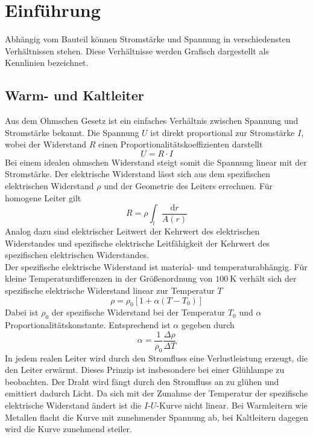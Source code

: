 \section{Einführung}
Abhängig vom Bauteil können Stromstärke und Spannung in verschiedensten Verhältnissen stehen. Diese Verhältnisse werden Grafisch dargestellt als Kennlinien bezeichnet. 
\subsection{Warm- und Kaltleiter}
Aus dem Ohmschen Gesetz ist ein einfaches Verhältnis zwischen Spannung und Stromstärke bekannt. Die Spannung $ U $ ist direkt proportional zur Stromstärke $ I $, wobei der Widerstand $ R $ einen Proportionalitätskoeffizienten darstellt 
\begin{equation}
	U = R\cdot I
\end{equation}
Bei einem idealen ohmschen Widerstand steigt somit die Spannung linear mit der Stromstärke. Der elektrische Widerstand lässt sich aus dem spezifischen elektrischen Widerstand $ \rho $ und der Geometrie des Leiters errechnen. Für homogene Leiter gilt
\begin{equation}
	R = \rho\int\nolimits_l\frac{\mathrm dr}{A(r)} 
\end{equation}
Analog dazu sind elektrischer Leitwert der Kehrwert des elektrischen Widerstandes und spezifische elektrische Leitfähigkeit der Kehrwert des spezifischen elektrischen Widerstandes.  \\
Der spezifische elektrische Widerstand ist material- und temperaturabhängig. Für kleine Temperaturdifferenzen in der Größenordnung von $ \SI{100}{\kelvin} $ verhält sich der spezifische elektrische Widerstand linear zur Temperatur $ T $
\begin{equation}
	\rho = \rho_0 [1 + \alpha(T - T_0)]
\end{equation}
Dabei ist $ \rho_0 $ der spezifische Widerstand bei der Temperatur $ T_0 $ und $ \alpha $ Proportionalitätskonstante. Entsprechend ist $ \alpha $ gegeben durch
\begin{equation}
	\alpha = \frac{1}{\rho_0} \frac{\Delta \rho}{\Delta T}
\end{equation}
In jedem realen Leiter wird durch den Stromfluss eine Verlustleistung erzeugt, die den Leiter erwärmt. Dieses Prinzip ist insbesondere bei einer Glühlampe zu beobachten. Der Draht wird fängt durch den Stromfluss an zu glühen und emittiert dadurch Licht. Da sich mit der Zunahme der Temperatur der spezifische elektrische Widerstand ändert ist die $ I $-$ U $-Kurve nicht linear. Bei Warmleitern wie Metallen flacht die Kurve mit zunehmender Spannung ab, bei Kaltleitern dagegen wird die Kurve zunehmend steiler.

